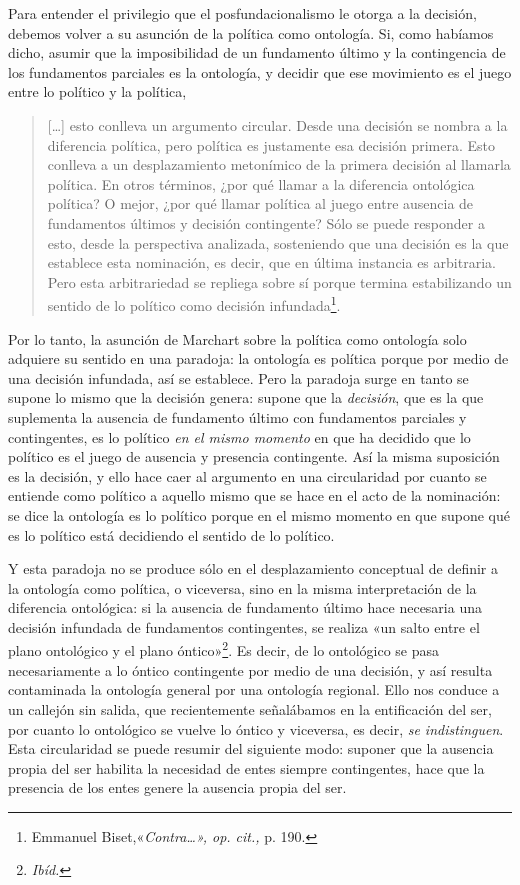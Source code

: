Para entender el privilegio que el posfundacionalismo le otorga a la decisión, debemos volver a su asunción de la política como ontología. Si, como habíamos dicho, asumir que la imposibilidad de un fundamento último y la contingencia de los fundamentos parciales es la ontología, y decidir que ese movimiento es el juego entre lo político y la política,

\begin{quote}
{[}\ldots{]} esto conlleva un argumento circular. Desde una decisión se nombra a la diferencia política, pero política es justamente esa decisión primera. Esto conlleva a un desplazamiento metonímico de la primera decisión al llamarla política. En otros términos, ¿por qué llamar a la diferencia ontológica política? O mejor, ¿por qué llamar política al juego entre ausencia de fundamentos últimos y decisión contingente? Sólo se puede responder a esto, desde la perspectiva analizada, sosteniendo que una decisión es la que establece esta nominación, es decir, que en última instancia es arbitraria. Pero esta arbitrariedad se repliega sobre sí porque termina estabilizando un sentido de lo político como decisión infundada\footnote{Emmanuel Biset,«\emph{Contra\ldots», op. cit.,} p. 190.}.
\end{quote}

Por lo tanto, la asunción de Marchart sobre la política como ontología solo adquiere su sentido en una paradoja: la ontología es política porque por medio de una decisión infundada, así se establece. Pero la paradoja surge en tanto se supone lo mismo que la decisión genera: supone que la \emph{decisión}, que es la que suplementa la ausencia de fundamento último con fundamentos parciales y contingentes, es lo político \emph{en el mismo momento} en que ha decidido que lo político es el juego de ausencia y presencia contingente. Así la misma suposición es la decisión, y ello hace caer al argumento en una circularidad por cuanto se entiende como político a aquello mismo que se hace en el acto de la nominación: se dice la ontología es lo político porque en el mismo momento en que supone qué es lo político está decidiendo el sentido de lo político.

Y esta paradoja no se produce sólo en el desplazamiento conceptual de definir a la ontología como política, o viceversa, sino en la misma interpretación de la diferencia ontológica: si la ausencia de fundamento último hace necesaria una decisión infundada de fundamentos contingentes, se realiza «un salto entre el plano ontológico y el plano óntico»\footnote{\emph{Ibíd.}}. Es decir, de lo ontológico se pasa necesariamente a lo óntico contingente por medio de una decisión, y así resulta contaminada la ontología general por una ontología regional. Ello nos conduce a un callejón sin salida, que recientemente señalábamos en la entificación del ser, por cuanto lo ontológico se vuelve lo óntico y viceversa, es decir, \emph{se indistinguen}. Esta circularidad se puede resumir del siguiente modo: suponer que la ausencia propia del ser habilita la necesidad de entes siempre contingentes, hace que la presencia de los entes genere la ausencia propia del ser.

